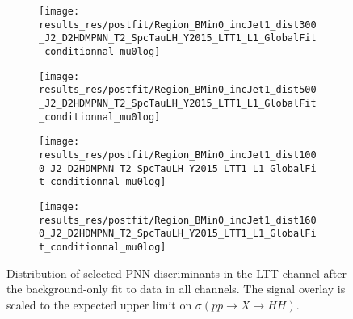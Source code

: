 \begin{figure}[htbp]
  \centering

  \begin{subfigure}{0.495\textwidth}
    \centering

    \texttt{[image: results\_res/postfit/Region\_BMin0\_incJet1\_dist300\_J2\_D2HDMPNN\_T2\_SpcTauLH\_Y2015\_LTT1\_L1\_GlobalFit\_conditionnal\_mu0log]}
  \end{subfigure}\hfill%
  \begin{subfigure}{0.495\textwidth}
    \centering

    \texttt{[image: results\_res/postfit/Region\_BMin0\_incJet1\_dist500\_J2\_D2HDMPNN\_T2\_SpcTauLH\_Y2015\_LTT1\_L1\_GlobalFit\_conditionnal\_mu0log]}
  \end{subfigure}

  \begin{subfigure}{0.495\textwidth}
    \centering

    \texttt{[image: results\_res/postfit/Region\_BMin0\_incJet1\_dist1000\_J2\_D2HDMPNN\_T2\_SpcTauLH\_Y2015\_LTT1\_L1\_GlobalFit\_conditionnal\_mu0log]}
  \end{subfigure}\hfill%
  \begin{subfigure}{0.495\textwidth}
    \centering

    \texttt{[image: results\_res/postfit/Region\_BMin0\_incJet1\_dist1600\_J2\_D2HDMPNN\_T2\_SpcTauLH\_Y2015\_LTT1\_L1\_GlobalFit\_conditionnal\_mu0log]}
  \end{subfigure}

  \caption[Distribution of selected PNN discriminants in the \lephad LTT channel
  after the background-only fit to data in all channels.]{Distribution of
    selected PNN discriminants in the \lephad LTT channel after the
    background-only fit to data in all channels. The signal overlay is scaled to
    the expected upper limit on $\sigma(pp \to X \to HH)$.}
\end{figure}



